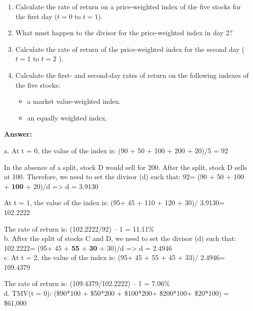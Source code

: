 \documentclass[11.5pt]{article}
\begin{document}
\begin{enumerate}[a]

\item Calculate the rate of return on a price-weighted index of the five stocks for the first day ($t = 0$ to $t = 1$).

\item What must happen to the divisor for the price-weighted index in day 2?

\item Calculate the rate of return of the price-weighted index for the second day ($t = 1$ to $t = 2$ ). 

\item Calculate the first- and second-day rates of return on the following indexes of the five stocks:

\begin{itemize}
	\item a market value-weighted index.
	
	\item an equally weighted index. 
\end{itemize}


\end{enumerate}


\vspace{10pt}

\indent \textbf{Answer:} 

\indent a.	At t = 0, the value of the index is: (90 + 50 + 100 + 200 + 20)/5 = 92 

In the absence of a split, stock D would sell for 200.  After the split, stock D sells at 100.  Therefore, we need to set the divisor (d) such that:
92= (90 + 50 + 100 + \textbf{100} + 20)/d => d = 3.9130 

At t = 1, the value of the index is: (95+ 45 + 110 + 120 + 30)/ 3.9130= 102.2222 

The rate of return is: (102.2222/92) – 1 = 11.11\%  \\

\indent b.	After the split of stocks C and D, we need to set the divisor (d) such that:
102.2222= (95+ 45 + \textbf{55} + \textbf{30} + 30)/d => d = 2.4946 \\


\indent c.	At t = 2, the value of the index is: (95+ 45 + 55 + 45 + 33)/ 2.4946= 109.4379 

The rate of return is: (109.4379/102.2222) – 1 = 7.06\%  \\

\indent d.	TMV(t = 0): (\$90*100 + \$50*200 + \$100*200+ \$200*100+ \$20*100) = \$61,000 
\end{document}
